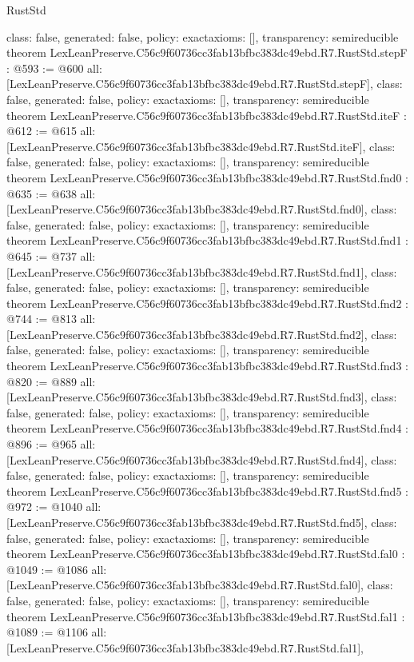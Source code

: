 \begin{lexlean}{RustStd}
\begin{coremodule}
{  class: false,
  generated: false,
  policy: exact{axioms: []},
  transparency: semireducible
}
theorem LexLeanPreserve.C56c9f60736cc3fab13bfbc383dc49ebd.R7.RustStd.stepF : @593 := @600 {
  all: [LexLeanPreserve.C56c9f60736cc3fab13bfbc383dc49ebd.R7.RustStd.stepF],
  class: false,
  generated: false,
  policy: exact{axioms: []},
  transparency: semireducible
}
theorem LexLeanPreserve.C56c9f60736cc3fab13bfbc383dc49ebd.R7.RustStd.iteF : @612 := @615 {
  all: [LexLeanPreserve.C56c9f60736cc3fab13bfbc383dc49ebd.R7.RustStd.iteF],
  class: false,
  generated: false,
  policy: exact{axioms: []},
  transparency: semireducible
}
theorem LexLeanPreserve.C56c9f60736cc3fab13bfbc383dc49ebd.R7.RustStd.fnd0 : @635 := @638 {
  all: [LexLeanPreserve.C56c9f60736cc3fab13bfbc383dc49ebd.R7.RustStd.fnd0],
  class: false,
  generated: false,
  policy: exact{axioms: []},
  transparency: semireducible
}
theorem LexLeanPreserve.C56c9f60736cc3fab13bfbc383dc49ebd.R7.RustStd.fnd1 : @645 := @737 {
  all: [LexLeanPreserve.C56c9f60736cc3fab13bfbc383dc49ebd.R7.RustStd.fnd1],
  class: false,
  generated: false,
  policy: exact{axioms: []},
  transparency: semireducible
}
theorem LexLeanPreserve.C56c9f60736cc3fab13bfbc383dc49ebd.R7.RustStd.fnd2 : @744 := @813 {
  all: [LexLeanPreserve.C56c9f60736cc3fab13bfbc383dc49ebd.R7.RustStd.fnd2],
  class: false,
  generated: false,
  policy: exact{axioms: []},
  transparency: semireducible
}
theorem LexLeanPreserve.C56c9f60736cc3fab13bfbc383dc49ebd.R7.RustStd.fnd3 : @820 := @889 {
  all: [LexLeanPreserve.C56c9f60736cc3fab13bfbc383dc49ebd.R7.RustStd.fnd3],
  class: false,
  generated: false,
  policy: exact{axioms: []},
  transparency: semireducible
}
theorem LexLeanPreserve.C56c9f60736cc3fab13bfbc383dc49ebd.R7.RustStd.fnd4 : @896 := @965 {
  all: [LexLeanPreserve.C56c9f60736cc3fab13bfbc383dc49ebd.R7.RustStd.fnd4],
  class: false,
  generated: false,
  policy: exact{axioms: []},
  transparency: semireducible
}
theorem LexLeanPreserve.C56c9f60736cc3fab13bfbc383dc49ebd.R7.RustStd.fnd5 : @972 := @1040 {
  all: [LexLeanPreserve.C56c9f60736cc3fab13bfbc383dc49ebd.R7.RustStd.fnd5],
  class: false,
  generated: false,
  policy: exact{axioms: []},
  transparency: semireducible
}
theorem LexLeanPreserve.C56c9f60736cc3fab13bfbc383dc49ebd.R7.RustStd.fal0 : @1049 := @1086 {
  all: [LexLeanPreserve.C56c9f60736cc3fab13bfbc383dc49ebd.R7.RustStd.fal0],
  class: false,
  generated: false,
  policy: exact{axioms: []},
  transparency: semireducible
}
theorem LexLeanPreserve.C56c9f60736cc3fab13bfbc383dc49ebd.R7.RustStd.fal1 : @1089 := @1106 {
  all: [LexLeanPreserve.C56c9f60736cc3fab13bfbc383dc49ebd.R7.RustStd.fal1],
}
\end{coremodule}
\end{lexlean}
